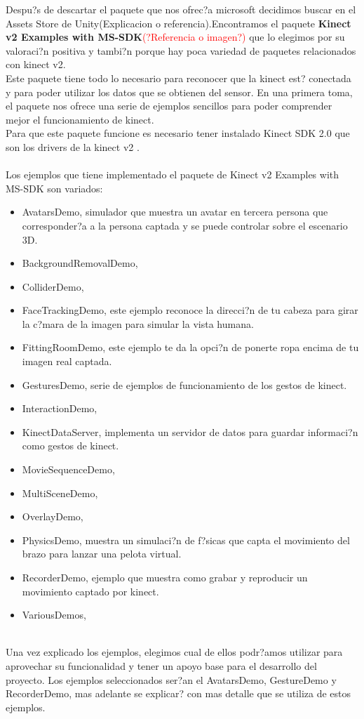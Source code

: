 Despu?s de descartar el paquete que nos ofrec?a microsoft decidimos buscar en el Assets Store de Unity(Explicacion o referencia).Encontramos el paquete \textbf {Kinect v2 Examples with MS-SDK}\textcolor{red}{(?Referencia o imagen?)} que lo elegimos por su valoraci?n positiva y tambi?n porque hay poca variedad de paquetes relacionados con kinect v2.\\
Este paquete tiene todo lo necesario para reconocer que la kinect est? conectada y para poder utilizar los datos que se obtienen del sensor. En una primera toma, el paquete nos ofrece una serie de ejemplos sencillos para poder comprender mejor el funcionamiento de kinect.\\ Para que este paquete funcione es necesario tener instalado Kinect SDK 2.0 que son los drivers de la kinect v2 .\\\\
Los ejemplos que tiene implementado el paquete de Kinect v2 Examples with MS-SDK  son variados:
\begin{itemize}
	\item AvatarsDemo, simulador que muestra un avatar en tercera persona que corresponder?a a la persona captada y se puede controlar sobre el escenario 3D.
	\item BackgroundRemovalDemo,
	\item ColliderDemo,
	\item FaceTrackingDemo, este ejemplo reconoce la direcci?n de tu cabeza para girar la c?mara de la imagen para simular la vista humana.
	\item FittingRoomDemo, este ejemplo te da la opci?n de ponerte ropa encima de tu imagen real captada.
	\item GesturesDemo, serie de ejemplos de funcionamiento de los gestos de kinect.
	\item InteractionDemo, 
	\item KinectDataServer, implementa un servidor de datos para guardar informaci?n como gestos de kinect.
	\item MovieSequenceDemo,
	\item MultiSceneDemo,
	\item OverlayDemo,
	\item PhysicsDemo, muestra un simulaci?n de f?sicas que capta el movimiento del brazo para lanzar una pelota virtual.
	\item RecorderDemo, ejemplo que muestra como grabar y reproducir un movimiento captado por kinect.
	\item VariousDemos,\\\\	
\end{itemize}
Una vez explicado los ejemplos, elegimos cual de ellos podr?amos utilizar para aprovechar su funcionalidad y tener un apoyo base para el desarrollo del proyecto. Los ejemplos seleccionados ser?an el AvatarsDemo, GestureDemo y RecorderDemo, mas adelante se explicar? con mas detalle que se utiliza de estos ejemplos.\\\\

